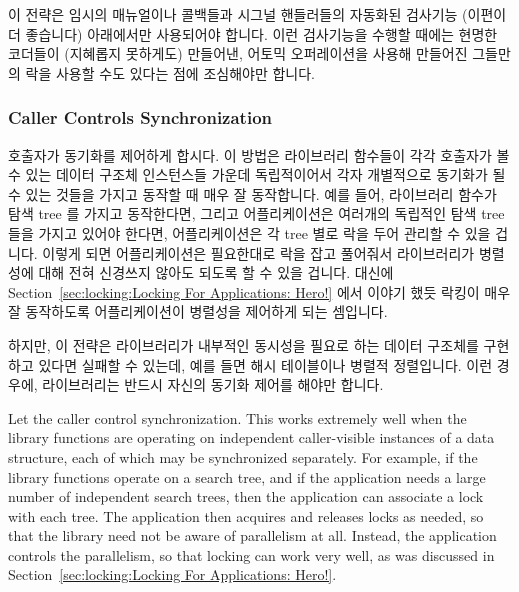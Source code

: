 이 전략은 임시의 매뉴얼이나 콜백들과 시그널 핸들러들의 자동화된 검사기능
(이편이 더 좋습니다) 아래에서만 사용되어야 합니다.
이런 검사기능을 수행할 때에는 현명한 코더들이 (지혜롭지 못하게도) 만들어낸,
어토믹 오퍼레이션을 사용해 만들어진 그들만의 락을 사용할 수도 있다는 점에
조심해야만 합니다.

\subsubsection{Caller Controls Synchronization}
\label{sec:locking:Caller Controls Synchronization}

호출자가 동기화를 제어하게 합시다.
이 방법은 라이브러리 함수들이 각각 호출자가 볼 수 있는 데이터 구조체 인스턴스들
가운데 독립적이어서 각자 개별적으로 동기화가 될 수 있는 것들을 가지고 동작할 때
매우 잘 동작합니다.
예를 들어, 라이브러리 함수가 탐색 tree 를 가지고 동작한다면, 그리고
어플리케이션은 여러개의 독립적인 탐색 tree 들을 가지고 있어야 한다면,
어플리케이션은 각 tree 별로 락을 두어 관리할 수 있을 겁니다.
이렇게 되면 어플리케이션은 필요한대로 락을 잡고 풀어줘서 라이브러리가 병렬성에
대해 전혀 신경쓰지 않아도 되도록 할 수 있을 겁니다.
대신에 Section~\ref{sec:locking:Locking For Applications: Hero!} 에서 이야기
했듯 락킹이 매우 잘 동작하도록 어플리케이션이 병렬성을 제어하게 되는 셈입니다.

하지만, 이 전략은 라이브러리가 내부적인 동시성을 필요로 하는 데이터 구조체를
구현하고 있다면 실패할 수 있는데, 예를 들면 해시 테이블이나 병렬적 정렬입니다.
이런 경우에, 라이브러리는 반드시 자신의 동기화 제어를 해야만 합니다.
\iffalse

Let the caller control synchronization.
This works extremely well when the library functions are operating
on independent caller-visible instances of a data structure, each
of which may be synchronized separately.
For example, if the library functions operate on a search tree,
and if the application needs a large number of independent search
trees, then the application can associate a lock with each tree.
The application then acquires and releases locks as needed, so
that the library need not be aware of parallelism at all.
Instead, the application controls the parallelism, so that locking
can work very well, as was discussed in
Section~\ref{sec:locking:Locking For Applications: Hero!}.

